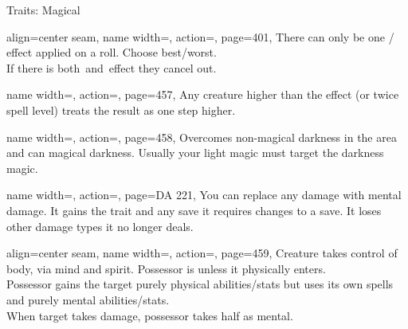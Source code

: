 \begin{PageFront}
\begin{Tables}{\frontTableHeight}
\begin{Table}{Traits: Magical}
            \begin{entry}{}{%
                align=center seam,
                name width=\conditionLength,%
                action=\stackbox[l][c]{\Fortune\\\vspace{-0.6ex}\Misfortune},
                page=401,
            }
                There can only be one \Fortune/\Misfortune\,effect applied on a roll.
                Choose best/worst.\\
                If there is both \Fortune\,and \Misfortune\,effect they cancel out.
            \end{entry}
            \begin{entry}{}{%
                name width=\conditionLength,%
                action=\Incapacitation,
                page=457,
            }
                Any creature higher than the effect {(or twice spell level)} treats the result as one step
                higher.
            \end{entry}
            \begin{entry}{}{%
                name width=\conditionLength,%
                action=\Light,
                page=458,
            }
                Overcomes non-magical darkness in the area and can  magical darkness.
                Usually your light magic must target the darkness magic.
            \end{entry}
            \begin{entry}{}{%
                name width=\conditionLength,%
                action=\Mindshift,
                page=DA 221,
            }
                You can replace any damage with mental damage. It gains the \Mental trait and any save it
                requires changes to a \WillT save. It loses other damage types it no longer deals.
            \end{entry}
            \begin{entry}{}{%
                align=center seam,
                name width=\conditionLength,%
                action=\Possession,
                page=459,
            }
                Creature takes control of body, via mind and spirit. Possessor is \Unconscious unless it
                physically enters.\\
                Possessor gains the target purely physical abilities/stats but uses its own spells and purely mental
                abilities/stats.\\
                When target takes damage, possessor takes half as mental. \hfill {}
\end{entry}
\end{Table}
\end{Tables}
\end{PageFront}
